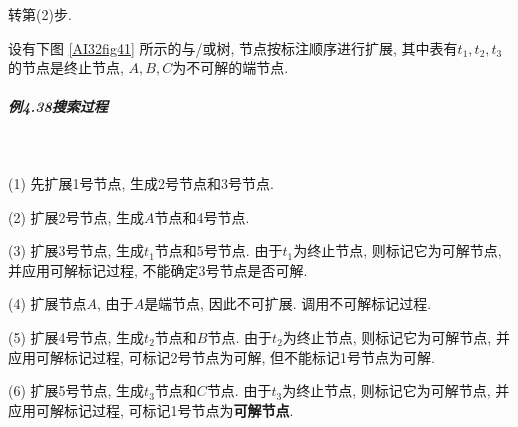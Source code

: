    \qquad  {} 转第(2)步.
\begin{example}\label{AIC4examp4.38}
    设有下图 \ref{AI32fig41} 所示的与/或树, 节点按标注顺序进行扩展, 其中表有$t_1,t_2,t_3$的节点是终止节点, $A,B,C$为不可解的端节点.
\end{example}
\subparagraph{例4.38搜索过程}~{}

(1) 先扩展1号节点, 生成2号节点和3号节点.

(2) 扩展2号节点, 生成$A$节点和4号节点.

(3) 扩展3号节点, 生成$t_1$节点和5号节点. 由于$t_1$为终止节点, 则标记它为可解节点, 并应用可解标记过程, 不能确定3号节点是否可解.

(4) 扩展节点$A$, 由于$A$是端节点, 因此不可扩展. 调用不可解标记过程.

(5) 扩展4号节点, 生成$t_2$节点和$B$节点. 由于$t_2$为终止节点, 则标记它为可解节点, 并应用可解标记过程, 可标记2号节点为可解, 但不能标记1号节点为可解.

(6) 扩展5号节点, 生成$t_3$节点和$C$节点. 由于$t_3$为终止节点, 则标记它为可解节点, 并应用可解标记过程, 可标记1号节点为\textbf{可解节点}.

